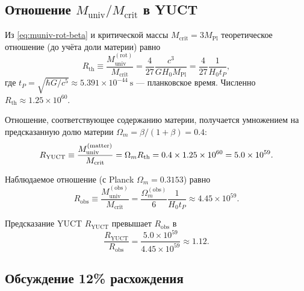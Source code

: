 \documentclass[11pt,a4paper]{article}
\begin{document}
	\subsection{Отношение \(M_{\mathrm{univ}} / M_{\mathrm{crit}}\) в YUCT}
	
	Из \eqref{eq:muniv-rot-beta} и критической массы \(M_{\mathrm{crit}} = 3 M_{\mathrm{Pl}}\) теоретическое отношение (до учёта доли материи) равно
	\begin{equation}
		R_{\mathrm{th}} \equiv \frac{M_{\mathrm{univ}}^{\mathrm{(rot)}}}{M_{\mathrm{crit}}} = \frac{4}{27} \frac{c^3}{G H_0 M_{\mathrm{Pl}}} = \frac{4}{27} \frac{1}{H_0 t_P},
		\label{eq:Rth}
	\end{equation}
	где \(t_P = \sqrt{\hbar G / c^5} \approx 5.391\times 10^{-44}\ \mathrm{s}\) — планковское время. Численно \(R_{\mathrm{th}} \approx 1.25\times 10^{60}\).
	
	Отношение, соответствующее содержанию материи, получается умножением на предсказанную долю материи \(\Omega_m = \beta/(1+\beta) = 0.4\):
	\begin{equation}
		\small
		R_{\mathrm{YUCT}} \equiv \frac{M_{\mathrm{univ}}^{\mathrm{(matter)}}}{M_{\mathrm{crit}}} = \Omega_m R_{\mathrm{th}} = 0.4 \times 1.25\times 10^{60} = 5.0\times 10^{59}.
		\label{eq:RYUCT}
	\end{equation}
	
	Наблюдаемое отношение (с Planck \(\Omega_m = 0.3153\)) равно
	\begin{equation}
		R_{\mathrm{obs}} \equiv \frac{M_{\mathrm{univ}}^{\mathrm{(obs)}}}{M_{\mathrm{crit}}} = \frac{\Omega_m^{\mathrm{(obs)}}}{6} \frac{1}{H_0 t_P} \approx 4.45\times 10^{59}.
		\label{eq:Robs}
	\end{equation}
	
	Предсказание YUCT \(R_{\mathrm{YUCT}}\) превышает \(R_{\mathrm{obs}}\) в
	\[
	\frac{R_{\mathrm{YUCT}}}{R_{\mathrm{obs}}} = \frac{5.0\times 10^{59}}{4.45\times 10^{59}} \approx 1.12.
	\]
	
	\subsection{Обсуждение 12\% расхождения}
	
\end{document}
